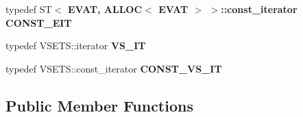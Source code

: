 \begin{CompactItemize}
\item 
typedef ST$<$ \bf{EVAT}, ALLOC$<$ \bf{EVAT} $>$ $>$::const\_\-iterator \textbf{CONST\_\-EIT}\label{classvat_3_01GRAPH__PROP_00_01V__Fk1__MINE__PROP_00_01ALLOC_00_01ST_01_4_5c44c257ac05bf6f1edd46ae0946b22f}

\item 
typedef VSETS::iterator \textbf{VS\_\-IT}\label{classvat_3_01GRAPH__PROP_00_01V__Fk1__MINE__PROP_00_01ALLOC_00_01ST_01_4_9ffa4f497bf7117d6034a60a47d20e9f}

\item 
typedef VSETS::const\_\-iterator \textbf{CONST\_\-VS\_\-IT}\label{classvat_3_01GRAPH__PROP_00_01V__Fk1__MINE__PROP_00_01ALLOC_00_01ST_01_4_f13a018784b5febd8743033792675a7a}

\end{CompactItemize}
\subsection*{Public Member Functions}
